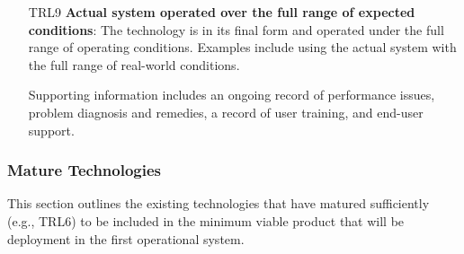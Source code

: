 \documentclass[10pt,twocolumn]{article}
\begin{document}
\begin{enumerate}
    \item[\footnotesize TRL9] \textbf{Actual system operated over the full range of expected conditions}: The technology is in its final form and operated under the full range of operating conditions. Examples include using the actual system with the full range of real-world conditions.
    
    Supporting information includes an ongoing record of performance issues, problem diagnosis and remedies, a record of user training, and end-user support.
    
\end{enumerate}

\subsubsection{Mature Technologies}

This section outlines the existing technologies that have matured sufficiently (e.g., TRL6) to be included in the minimum viable product that will be deployment in the first operational system.
\end{document}
